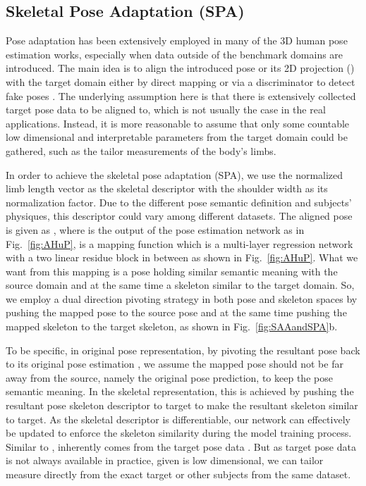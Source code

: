 \documentclass[twocolumn]{svjour3}          \smartqed  \usepackage{graphicx}
\newcommand{\figref}[1]{Fig.~\ref{#1}}
\begin{document}
\subsection{Skeletal Pose Adaptation (SPA)}
Pose adaptation has been extensively employed in many of the 3D human pose estimation works, especially when data outside of the benchmark domains are introduced. The main idea is to align the introduced pose or its 2D projection (\cite{chen2019unsupervised}) with 
the target domain either by direct mapping \cite{bogo2016keep} or via a discriminator to detect fake poses \cite{yang20183d}. 
The underlying assumption here is that there is extensively collected target pose data to be aligned to, which is not usually the case in the real applications. 
Instead, it is more reasonable to assume that only some countable low dimensional and interpretable parameters from the target domain could be gathered, such as the tailor measurements of the body's limbs. 

In order to achieve the skeletal pose adaptation (SPA), we use the normalized limb length vector  as the skeletal descriptor with the shoulder width as its normalization factor. Due to the different pose semantic definition and subjects' physiques, this descriptor could vary  among different datasets. The aligned pose is given as , where  is the output of the pose estimation network as  in \figref{fig:AHuP},   is a mapping function which is a multi-layer regression network with a two linear residue block in between as shown in \figref{fig:AHuP}. What we want from this mapping is a pose holding similar semantic meaning with the source domain and at the same time a skeleton similar to the target domain.  So, we employ a dual direction pivoting strategy in both pose and skeleton spaces by pushing the mapped pose to the source pose and at the same time pushing the mapped skeleton to the target skeleton, as shown in \figref{fig:SAAandSPA}b. 

To be specific, in original pose representation, by pivoting the resultant pose back to its original pose estimation , we assume the mapped pose should  not be far away from the source, namely the original pose prediction, to keep the pose semantic meaning. In the skeletal representation, this is achieved by pushing the resultant pose skeleton descriptor  to target  to make the resultant skeleton similar to target. As the skeletal descriptor  is differentiable, our network can  effectively be updated to enforce the skeleton similarity during the model training process. 
Similar to ,  inherently comes from the target pose data . 
But as target pose data is not always available in practice, given  is low dimensional, we can tailor measure   directly from the exact target or other subjects from the same dataset. 
\end{document}
